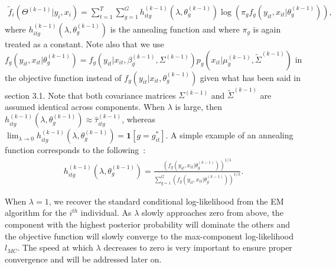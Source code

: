 \documentclass[11pt,letter]{article}
\begin{document}
\begin{align}\label{eqn:19}
\tilde{f}_{i}(\Theta^{(k-1)}|y_{i},x_i) = \sum_{t=1}^T \sum_{g=1}^G h^{(k-1)}_{itg}(\lambda,\theta_g^{(k-1)}) \log  (\pi_{g}f_{g}(y_{it},x_{it}|\theta^{(k-1)}_g)),
\end{align}
where $h^{(k-1)}_{itg}(\lambda,\theta_g^{(k-1)})$ is the annealing function and where $\pi_{g}$ is again treated as a constant. Note also that we use $f_{g}(y_{it},x_{it}|\theta^{(k-1)}_g) = f_{g}(y_{it}|x_{it},\beta^{(k-1)}_{g},\Sigma^{(k-1)})p_g(x_{it}|\mu^{(k-1)}_g,\tilde{\Sigma}^{(k-1)})$ in the objective function instead of $f_{g}(y_{it}|x_{it},\theta^{(k-1)}_g)$ given what has been said in section 3.1. Note that both covariance matrices $\Sigma^{(k-1)}$ and $\tilde{\Sigma}^{(k-1)}$ are assumed identical across components. When $\lambda$ is large, then $h^{(k-1)}_{itg}(\lambda,\theta_g^{(k-1)}) \approx \hat{\tau}^{(k-1)}_{itg}$, whereas $\lim_{\lambda\to 0} h^{(k-1)}_{itg}(\lambda,\theta_g^{(k-1)}) = \mathbf{1}[g = g^*_{it}]$. A simple example of an annealing function corresponds to the following~:
\begin{align*}
h^{(k-1)}_{itg}(\lambda,\theta_g^{(k-1)}) = \frac{(f_g(y_{it},x_{it}|\theta^{(k-1)}_g))^{1/\lambda}}{\sum_{g=1}^G (f_g(y_{it},x_{it}|\theta^{(k-1)}_g))^{1/\lambda}}.
\end{align*}
\par
When $\lambda = 1$, we recover the standard conditional log-likelihood from the EM algorithm for the $i^{th}$ individual. As $\lambda$ slowly approaches zero from above, the component with the highest posterior probability will dominate the others and the objective function will slowly converge to the max-component log-likelihood $l_{MC}$. The speed at which $\lambda$ decreases to zero is very important to ensure proper convergence and will be addressed later on. 
\end{document}

